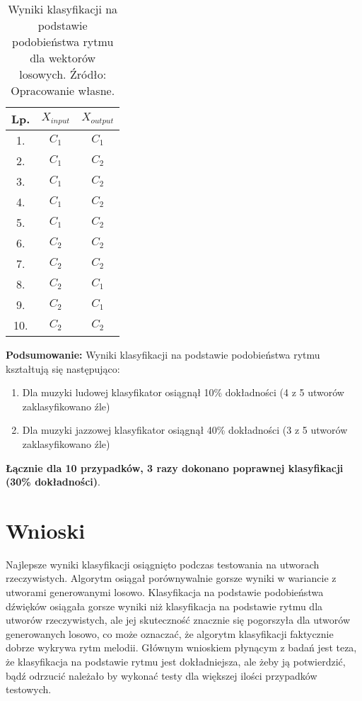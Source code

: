 \begin{table}
\begin{tabular}{|c|c|c|}
\hline
 Lp. & $X_{input}$ & $X_{output}$ \\ \hline
 1.   & $C_{1}$      & $C_{1}$      \\ \hline
 2.   & $C_{1}$      & $C_{2}$     \\ \hline
 3.   & $C_{1}$      & $C_{2}$      \\ \hline
 4.   & $C_{1}$      & $C_{2}$     \\ \hline
 5.   & $C_{1}$      & $C_{2}$      \\ \hline
 6.   & $C_{2}$      & $C_{2}$    \\ \hline
 7.   & $C_{2}$      & $C_{2}$     \\ \hline
 8.   & $C_{2}$      & $C_{1}$     \\ \hline
 9.   & $C_{2}$      & $C_{1}$     \\ \hline
 10.  & $C_{2}$      & $C_{2}$      \\ \hline
 \end{tabular}
 \centering
 \caption{Wyniki klasyfikacji na podstawie podobieństwa rytmu dla wektorów losowych. Źródło: Opracowanie własne.}
\label{tabela 4}
 \end{table}
 \textbf{Podsumowanie:}
 Wyniki klasyfikacji na podstawie podobieństwa rytmu kształtują się następująco:

\begin{enumerate}
    \item Dla muzyki ludowej klasyfikator osiągnął 10\% dokładności (4 z 5 utworów zaklasyfikowano źle)
    \item Dla muzyki jazzowej klasyfikator osiągnął 40\% dokładności (3 z 5 utworów zaklasyfikowano źle)
\end{enumerate}
\textbf{Łącznie dla 10 przypadków, 3 razy dokonano poprawnej klasyfikacji (30\% dokładności)}.

\section{Wnioski}
Najlepsze wyniki klasyfikacji osiągnięto podczas testowania na utworach rzeczywistych. Algorytm osiągał porównywalnie gorsze wyniki w wariancie z utworami generowanymi losowo. Klasyfikacja na podstawie podobieństwa dźwięków osiągała gorsze wyniki niż klasyfikacja na podstawie rytmu dla utworów rzeczywistych, ale jej skuteczność znacznie się pogorszyła dla utworów generowanych losowo, co może oznaczać, że algorytm klasyfikacji faktycznie dobrze wykrywa rytm melodii. Głównym wnioskiem płynącym z badań jest teza, że klasyfikacja na podstawie rytmu jest dokładniejsza, ale żeby ją potwierdzić, bądź odrzucić należało by wykonać testy dla większej ilości przypadków testowych.